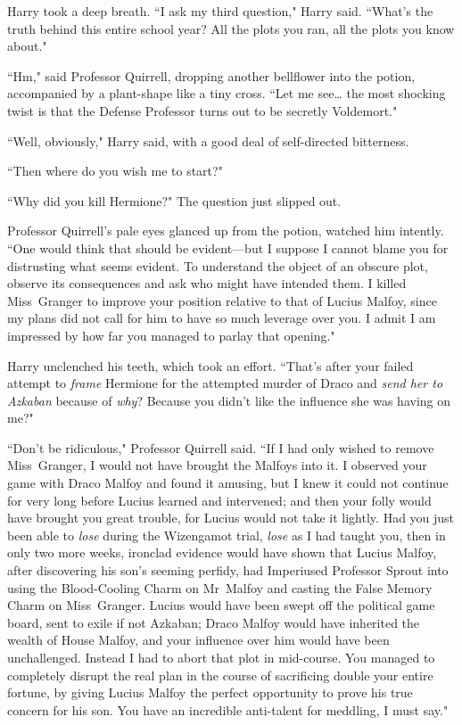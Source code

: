 Harry took a deep breath. ``I ask my third question," Harry said. ``What's the truth behind this entire school year? All the plots you ran, all the plots you know about."

``Hm," said Professor Quirrell, dropping another bellflower into the potion, accompanied by a plant-shape like a tiny cross. ``Let me see{\ldots} the most shocking twist is that the Defense Professor turns out to be secretly Voldemort."

``Well, obviously," Harry said, with a good deal of self-directed bitterness.

``Then where do you wish me to start?"

``Why did you kill Hermione?" The question just slipped out.

Professor Quirrell's pale eyes glanced up from the potion, watched him intently. ``One would think that should be evident—but I suppose I cannot blame you for distrusting what seems evident. To understand the object of an obscure plot, observe its consequences and ask who might have intended them. I killed Miss~Granger to improve your position relative to that of Lucius Malfoy, since my plans did not call for him to have so much leverage over you. I admit I am impressed by how far you managed to parlay that opening."

Harry unclenched his teeth, which took an effort. ``That's after your failed attempt to \emph{frame} Hermione for the attempted murder of Draco and \emph{send her to Azkaban} because of \emph{why}? Because you didn't like the influence she was having on me?"

``Don't be ridiculous," Professor Quirrell said. ``If I had only wished to remove Miss~Granger, I would not have brought the Malfoys into it. I observed your game with Draco Malfoy and found it amusing, but I knew it could not continue for very long before Lucius learned and intervened; and then your folly would have brought you great trouble, for Lucius would not take it lightly. Had you just been able to \emph{lose} during the Wizengamot trial, \emph{lose} as I had taught you, then in only two more weeks, ironclad evidence would have shown that Lucius Malfoy, after discovering his son's seeming perfidy, had Imperiused Professor Sprout into using the Blood-Cooling Charm on Mr~Malfoy and casting the False Memory Charm on Miss~Granger. Lucius would have been swept off the political game board, sent to exile if not Azkaban; Draco Malfoy would have inherited the wealth of House Malfoy, and your influence over him would have been unchallenged. Instead I had to abort that plot in mid-course. You managed to completely disrupt the real plan in the course of sacrificing double your entire fortune, by giving Lucius Malfoy the perfect opportunity to prove his true concern for his son. You have an incredible anti-talent for meddling, I must say."

